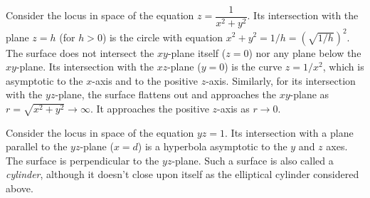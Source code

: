 \begin{example}
	Consider the locus in space of the equation
	$z = \dfrac 1{x^2 + y^2}$.   Its intersection with the plane $z = h$
	(for $h > 0$) is the circle with equation
	$ x^2 + y^2 = 1/h = (\sqrt{1/h})^2$.   The surface does not intersect
	the $xy$-plane itself ($z = 0$) nor any plane below the $xy$-plane.
	Its intersection with the $xz$-plane ($y = 0$) is the curve
	$z = 1/x^2$, which is asymptotic to the $x$-axis
	and to the positive $z$-axis.  Similarly, for its intersection
	with the $yz$-plane,   the surface flattens out and approaches the
	$xy$-plane as $r = \sqrt{x^2 + y^2} \to \infty$.  It approaches the
	positive $z$-axis as $r \to 0$.


	\begin{center}
	\end{center}
\end{example}

\begin{example}
	Consider the locus in space of the equation $yz = 1$.   Its intersection
	with a plane parallel to the $yz$-plane ($x = d$) is a hyperbola
	asymptotic to the $y$ and $z$ axes.  The surface is perpendicular
	to the $yz$-plane.  Such a surface is also called a \emph{cylinder},
	although it doesn't close upon itself as the elliptical cylinder considered
	above.
\end{example}

